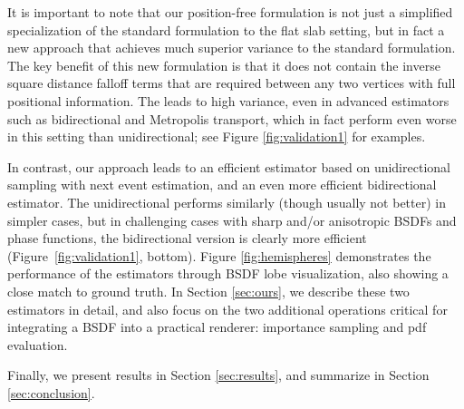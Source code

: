 It is important to note that our position-free formulation is not just a simplified specialization of the standard formulation to the flat slab setting, but in fact a new approach that achieves much superior variance to the standard formulation. The key benefit of this new formulation is that it does not contain the inverse square distance falloff terms that are required between any two vertices with full positional information. The leads to high variance, even in advanced estimators such as bidirectional and Metropolis transport, which in fact perform even worse in this setting than unidirectional; see Figure \ref{fig:validation1} for examples.

In contrast, our approach leads to an efficient estimator based on unidirectional sampling with next event estimation, and an even more efficient bidirectional estimator. The unidirectional performs similarly (though usually not better) in simpler cases, but in challenging cases with sharp and/or anisotropic BSDFs and phase functions, the bidirectional version is clearly more efficient (Figure~\ref{fig:validation1}, bottom). Figure \ref{fig:hemispheres} demonstrates the performance of the estimators through BSDF lobe visualization, also showing a close match to ground truth. In Section \ref{sec:ours}, we describe these two estimators in detail, and also focus on the two additional operations critical for integrating a BSDF into a practical renderer: importance sampling and pdf evaluation.

Finally, we present results in Section \ref{sec:results}, and summarize in Section \ref{sec:conclusion}.



